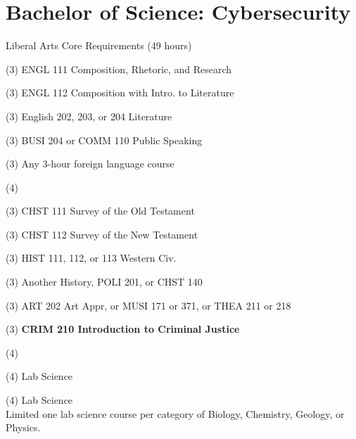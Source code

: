 \label{program:bs-cyber}%
\section*{Bachelor of Science: Cybersecurity}

\begin{reqgroup}{Liberal Arts Core Requirements (49 hours)}
\begin{checklist}
\begin{minipage}[t]{0.5\linewidth}
	\item (3) ENGL 111 Composition, Rhetoric, and Research
	\item (3) ENGL 112 Composition with Intro\@. to Literature
	\item (3) English 202, 203, or 204 Literature
	\item (3) BUSI 204 or COMM 110 Public Speaking
	\item (3) Any 3-hour foreign language course
	\item (4) 
	\item (3) CHST 111  Survey of the Old Testament
	\item (3) CHST 112  Survey of the New Testament
	\item (3) HIST 111, 112, or 113 Western Civ.
\end{minipage}
\begin{minipage}[t]{0.5\linewidth}
	\item (3) Another History, POLI 201, or CHST 140
	\item (3) ART 202 Art Appr, or MUSI 171 or 371, or THEA 211 or 218
	\item (3) \textbf{CRIM 210 Introduction to Criminal Justice}
	\item (4) 
	\item (4) Lab Science
	\item (4) Lab Science\\Limited one lab science course per category of Biology, Chemistry,
Geology, or Physics.
\end{minipage}
\end{checklist}
\end{reqgroup}



